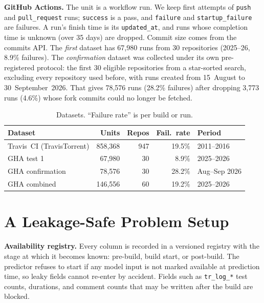 \documentclass[conference]{IEEEtran}
\begin{document}
\textbf{GitHub Actions.} The unit is a workflow run. We keep first attempts of \texttt{push} and \texttt{pull\_request} runs; \texttt{success} is a pass, and \texttt{failure} and \texttt{startup\_failure} are failures. A run's finish time is its \texttt{updated\_at}, and runs whose completion time is unknown (over 35 days) are dropped. Commit size comes from the commits API. The \emph{first} dataset has 67{,}980 runs from 30 repositories (2025--26, 8.9\% failures). The \emph{confirmation} dataset was collected under its own pre-registered protocol: the first 30 eligible repositories from a star-sorted search, excluding every repository used before, with runs created from 15~August to 30~September~2026. That gives 78{,}576 runs (28.2\% failures) after dropping 3{,}773 runs (4.6\%) whose fork commits could no longer be fetched.

\begin{table}[t]
\caption{Datasets. ``Failure rate'' is per build or run.}
\label{tab:data}
\centering
\footnotesize
\setlength{\tabcolsep}{4pt}
\begin{tabular}{@{}lrrrl@{}}
\toprule
Dataset & Units & Repos & Fail.\ rate & Period \\
\midrule
Travis~CI (TravisTorrent) & 858{,}368 & 947 & 19.5\% & 2011--2016 \\
GHA test 1 & 67{,}980 & 30 & 8.9\% & 2025--2026 \\
GHA confirmation & 78{,}576 & 30 & 28.2\% & Aug--Sep 2026 \\
GHA combined & 146{,}556 & 60 & 19.2\% & 2025--2026 \\
\bottomrule
\end{tabular}
\end{table}

\section{A Leakage-Safe Problem Setup}
\label{sec:leakage}

\textbf{Availability registry.} Every column is recorded in a versioned registry with the stage at which it becomes known: pre-build, build start, or post-build. The predictor refuses to start if any model input is not marked available at prediction time, so leaky fields cannot re-enter by accident. Fields such as \texttt{tr\_log\_*} test counts, durations, and comment counts that may be written after the build are blocked.
\end{document}
